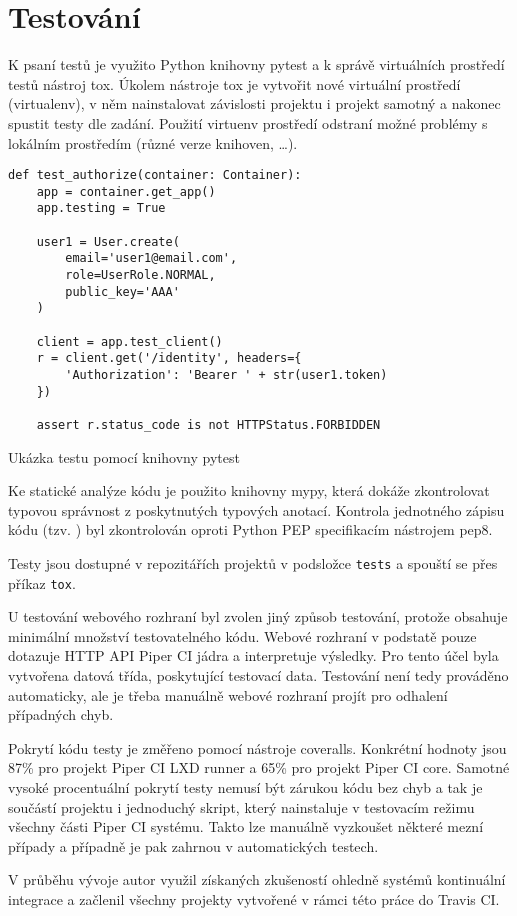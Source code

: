 \chapter{Testování}

K psaní testů je využito Python knihovny pytest a k správě virtuálních prostředí testů nástroj tox.
Úkolem nástroje tox je vytvořit nové virtuální prostředí (virtualenv), v něm nainstalovat závislosti projektu i projekt samotný a nakonec spustit testy dle zadání.
Použití virtuenv prostředí odstraní možné problémy s lokálním prostředím (různé verze knihoven, \ldots).

\begin{listing}[ht]
\begin{verbatim}
def test_authorize(container: Container):
    app = container.get_app()
    app.testing = True

    user1 = User.create(
        email='user1@email.com',
        role=UserRole.NORMAL,
        public_key='AAA'
    )

    client = app.test_client()
    r = client.get('/identity', headers={
        'Authorization': 'Bearer ' + str(user1.token)
    })

    assert r.status_code is not HTTPStatus.FORBIDDEN
\end{verbatim}
\caption{Ukázka testu pomocí knihovny pytest}
\end{listing}

Ke statické analýze kódu je použito knihovny mypy, která dokáže zkontrolovat typovou správnost z poskytnutých typových anotací.
Kontrola jednotného zápisu kódu (tzv. ) byl zkontrolován oproti Python PEP specifikacím nástrojem pep8.

Testy jsou dostupné v repozitářích projektů v podsložce \verb|tests| a spouští se přes příkaz \verb|tox|.

U testování webového rozhraní byl zvolen jiný způsob testování, protože obsahuje minimální množství testovatelného kódu.
Webové rozhraní v podstatě pouze dotazuje HTTP API Piper CI jádra a interpretuje výsledky.
Pro tento účel byla vytvořena  datová třída, poskytující testovací data.
Testování není tedy prováděno automaticky, ale je třeba manuálně webové rozhraní projít pro odhalení případných chyb.


Pokrytí kódu testy je změřeno pomocí nástroje coveralls.
Konkrétní hodnoty jsou 87\% pro projekt Piper CI LXD runner a 65\% pro projekt Piper CI core.
Samotné vysoké procentuální pokrytí testy nemusí být zárukou kódu bez chyb a tak je součástí projektu i jednoduchý skript, který nainstaluje v testovacím režimu všechny části Piper CI systému.
Takto lze manuálně vyzkoušet některé mezní případy a případně je pak zahrnou v automatických testech.

V průběhu vývoje autor využil získaných zkušeností ohledně systémů kontinuální integrace a začlenil všechny projekty vytvořené v rámci této práce do Travis CI.

